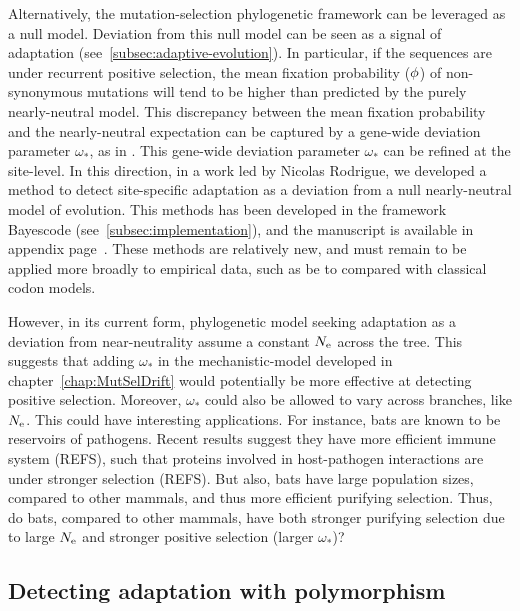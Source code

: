 Alternatively, the mutation-selection phylogenetic framework can be leveraged as a null model.
Deviation from this null model can be seen as a signal of adaptation (see~\ref{subsec:adaptive-evolution}).
In particular, if the sequences are under recurrent positive selection, the mean fixation probability ($\phi$) of non-synonymous mutations will tend to be higher than predicted by the purely nearly-neutral model.
This discrepancy between the mean fixation probability and the nearly-neutral expectation can be captured by a gene-wide deviation parameter $\omega_*$, as in \citet{Rodrigue2016}.
This gene-wide deviation parameter $\omega_*$ can be refined at the site-level.
In this direction, in a work led by Nicolas Rodrigue, we developed a method to detect site-specific adaptation as a deviation from a null nearly-neutral model of evolution.
This methods has been developed in the framework Bayescode (see~\ref{subsec:implementation}), and the manuscript is available in appendix page~\pageref{sec-appendix:MutSelM3starMBE}.
These methods are relatively new, and must remain to be applied more broadly to empirical data, such as be to compared with classical codon models.

However, in its current form, phylogenetic model seeking adaptation as a deviation from near-neutrality assume a constant $N_{\textrm{e}}$ across the tree.
This suggests that adding $\omega_*$ in the mechanistic-model developed in chapter~\ref{chap:MutSelDrift} would potentially be more effective at detecting positive selection.
Moreover, $\omega_*$ could also be allowed to vary across branches, like $N_{\textrm{e}}$.
This could have interesting applications.
For instance, bats are known to be reservoirs of pathogens.
Recent results suggest they have more efficient immune system (REFS), such that proteins involved in host-pathogen interactions are under stronger selection (REFS).
But also, bats have large population sizes, compared to other mammals, and thus more efficient purifying selection.
Thus, do bats, compared to other mammals, have both stronger purifying selection due to large $N_{\textrm{e}}$ and stronger positive selection (larger $\omega_*$)?

\subsection{Detecting adaptation with polymorphism}
\label{subsec:detecting-adaptation-with-polymorphism}

